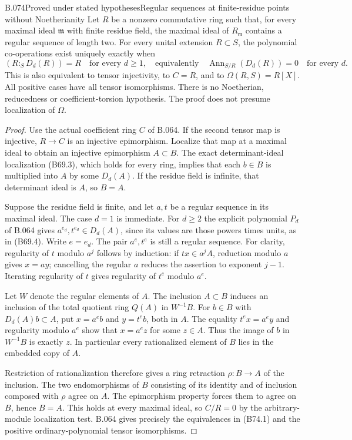 \begin{saresult}{B.074}{Proved under stated hypotheses}{Regular sequences at finite-residue points without Noetherianity}
Let $R$ be a nonzero commutative ring such that, for every maximal ideal
$\mathfrak m$ with finite residue field, the maximal ideal of
$R_{\mathfrak m}$ contains a regular sequence of length two.
For every unital extension $R\subset S$, the polynomial co-operations
exist uniquely exactly when
\[
 (R:_S D_d(R))=R\quad\text{for every }d\ge1,
 \quad\text{equivalently}\quad
 \operatorname{Ann}_{S/R}(D_d(R))=0\quad\text{for every }d. \tag{B74.1}
\]
This is also equivalent to tensor injectivity, to $C=R$, and to
$\Omega(R,S)=R[X]$. All positive cases have all tensor isomorphisms.
There is no Noetherian, reducedness or coefficient-torsion hypothesis.
The proof does not presume localization of $\Omega$.
\end{saresult}
\begin{proof}
Use the actual coefficient ring $C$ of B.064. If the second tensor map
is injective, $R\to C$ is an injective epimorphism. Localize that map
at a maximal ideal to obtain an injective epimorphism $A\subset B$.
The exact determinant-ideal localization (B69.3), which holds for
every ring, implies that each $b\in B$ is multiplied into $A$ by some
$D_d(A)$. If the residue field is infinite, that determinant ideal is
$A$, so $B=A$.

Suppose the residue field is finite, and let $a,t$ be a regular sequence
in its maximal ideal. The case $d=1$ is immediate. For $d\ge2$ the
explicit polynomial $P_d$ of B.064 gives
$a^{e_d},t^{e_d}\in D_d(A)$, since its values are those powers times
units, as in (B69.4). Write $e=e_d$. The pair $a^e,t^e$ is still a
regular sequence. For clarity, regularity of $t$ modulo $a^j$ follows
by induction: if $tx\in a^jA$, reduction modulo $a$ gives $x=ay$;
cancelling the regular $a$ reduces the assertion to exponent $j-1$.
Iterating regularity of $t$ gives regularity of $t^e$ modulo $a^e$.

Let $W$ denote the regular elements of $A$. The inclusion $A\subset B$
induces an inclusion of the total quotient ring $Q(A)$ in $W^{-1}B$.
For $b\in B$ with $D_d(A)b\subset A$, put $x=a^eb$ and $y=t^eb$,
both in $A$. The equality $t^ex=a^ey$ and regularity modulo $a^e$ show
that $x=a^ez$ for some $z\in A$. Thus the image of $b$ in $W^{-1}B$
is exactly $z$. In particular every rationalized element of $B$ lies
in the embedded copy of $A$.

Restriction of rationalization therefore gives a ring retraction
$\rho:B\to A$ of the inclusion. The two endomorphisms of $B$ consisting
of its identity and of inclusion composed with $\rho$ agree on $A$.
The epimorphism property forces them to agree on $B$, hence $B=A$.
This holds at every maximal ideal, so $C/R=0$ by the arbitrary-module
localization test. B.064 gives precisely the equivalences in (B74.1)
and the positive ordinary-polynomial tensor isomorphisms.
\end{proof}
